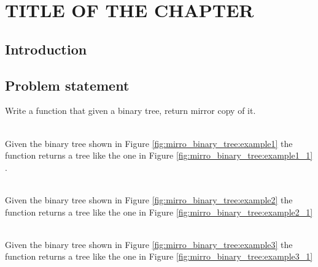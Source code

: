 %

\chapter{TITLE OF THE CHAPTER}
\label{ch:mirror_binary_tree}
\section*{Introduction}

\section{Problem statement}
\begin{exercise}
	Write a function that given a binary tree, return mirror copy of it.

	\begin{example}
		\hfill \\
		Given the binary tree shown in Figure \ref{fig:mirro_binary_tree:example1} the function returns a tree like the one in Figure \ref{fig:mirro_binary_tree:example1_1}
		\label{ex:mirro_binary_tree:example1}.
	\end{example}

	\begin{example}
		\hfill \\
		Given the binary tree shown in Figure \ref{fig:mirro_binary_tree:example2} the function returns a tree like the one in Figure \ref{fig:mirro_binary_tree:example2_1}
		\label{ex:mirro_binary_tree:example2}
	\end{example}

	\begin{example}
		\hfill \\
		Given the binary tree shown in Figure \ref{fig:mirro_binary_tree:example3} the function returns a tree like the one in Figure \ref{fig:mirro_binary_tree:example3_1}
		\label{ex:mirro_binary_tree:example3}
	\end{example}
\end{exercise}


